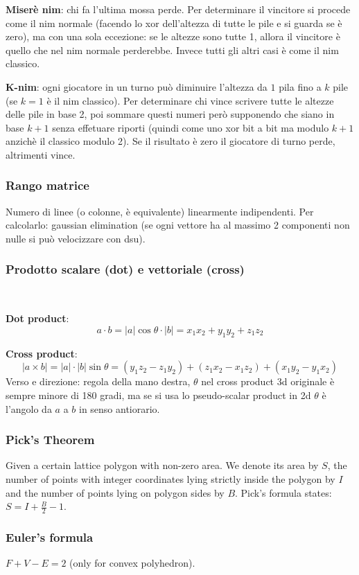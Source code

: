 \textbf{Miserè nim}: chi fa l'ultima mossa perde. Per determinare il vincitore si procede come il nim normale (facendo lo xor dell'altezza di tutte le pile e si guarda se è zero), ma con una sola eccezione: se le altezze sono tutte 1, allora il vincitore è quello che nel nim normale perderebbe. Invece tutti gli altri casi è come il nim classico.

\textbf{K-nim}: ogni giocatore in un turno può diminuire l'altezza da $1$ pila fino a $k$ pile (se $k=1$ è il nim classico). Per determinare chi vince scrivere tutte le altezze delle pile in base 2, poi sommare questi numeri però supponendo che siano in base $k+1$ senza effetuare riporti (quindi come uno xor bit a bit ma modulo $k+1$ anzichè il classico modulo 2). Se il risultato è zero il giocatore di turno perde, altrimenti vince.

\subsubsection{Rango matrice}
Numero di linee (o colonne, è equivalente) linearmente indipendenti. Per calcolarlo: gaussian elimination (se ogni vettore ha al massimo 2 componenti non nulle si può velocizzare con dsu).

\subsubsection{Prodotto scalare (dot) e vettoriale (cross)} 
\,

\textbf{Dot product}: 
$$a\cdot b = |a| \cos \theta \cdot |b| = x_1 x_2 + y_1 y_2 + z_1 z_2$$

\textbf{Cross product}:  
$$|a\times b| = |a| \cdot |b| \sin \theta = (y_1 z_2 - z_1 y_2) + (z_1 x_2 - x_1 z_2) + (x_1 y_2 - y_1 x_2)$$ 
Verso e direzione: regola della mano destra, $\theta$ nel cross product 3d originale è sempre minore di 180 gradi, ma se si usa lo pseudo-scalar product in 2d $\theta$ è l'angolo da $a$ a $b$ in senso antiorario.

\subsubsection{Pick's Theorem}
Given a certain lattice polygon with non-zero area.
We denote its area by $S$, the number of points with integer coordinates lying strictly inside the polygon by $I$ and the number of points lying on polygon sides by $B$.
Pick's formula states: $S=I+\frac{B}{2}-1$.

\subsubsection{Euler's formula} $F+V-E=2$ (only for convex polyhedron). 

